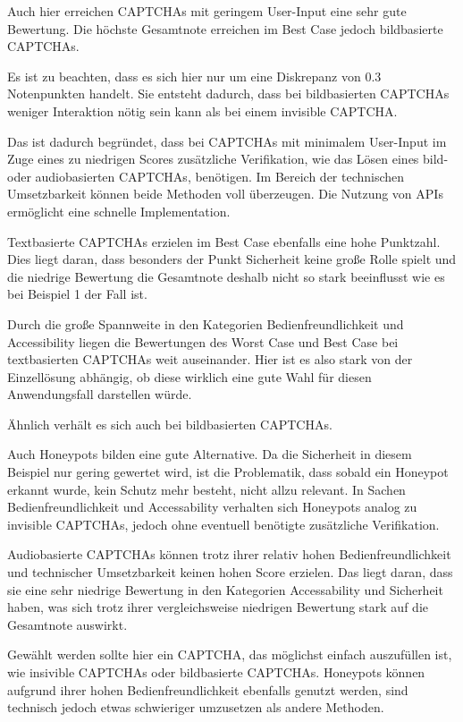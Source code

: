 Auch hier erreichen CAPTCHAs mit geringem User-Input eine sehr gute Bewertung.
Die höchste Gesamtnote erreichen im Best Case jedoch bildbasierte CAPTCHAs.

Es ist zu beachten, dass es sich hier nur um eine Diskrepanz von 0.3 Notenpunkten handelt. 
Sie entsteht dadurch, dass bei bildbasierten CAPTCHAs weniger Interaktion nötig sein kann als bei einem invisible CAPTCHA.

Das ist dadurch begründet, dass bei CAPTCHAs mit minimalem User-Input im Zuge eines zu niedrigen Scores zusätzliche Verifikation, 
wie das Lösen eines bild- oder audiobasierten CAPTCHAs, benötigen.
Im Bereich der technischen Umsetzbarkeit können beide Methoden voll überzeugen. 
Die Nutzung von APIs ermöglicht eine schnelle Implementation.

Textbasierte CAPTCHAs erzielen im Best Case ebenfalls eine hohe Punktzahl. 
Dies liegt daran, dass besonders der Punkt Sicherheit keine große Rolle spielt
und die niedrige Bewertung die Gesamtnote deshalb nicht so stark beeinflusst wie es bei Beispiel 1 der Fall ist. 

Durch die große Spannweite in den Kategorien Bedienfreundlichkeit und Accessibility
liegen die Bewertungen des Worst Case und Best Case bei textbasierten CAPTCHAs weit auseinander.
Hier ist es also stark von der Einzellösung abhängig, ob diese wirklich eine gute Wahl für diesen Anwendungsfall darstellen würde.

Ähnlich verhält es sich auch bei bildbasierten CAPTCHAs. 

Auch Honeypots bilden eine gute Alternative. 
Da die Sicherheit in diesem Beispiel nur gering gewertet wird, ist die Problematik, dass sobald ein Honeypot erkannt wurde,
kein Schutz mehr besteht, nicht allzu relevant. 
In Sachen Bedienfreundlichkeit und Accessability verhalten sich Honeypots analog zu invisible CAPTCHAs,
jedoch ohne eventuell benötigte zusätzliche Verifikation.

Audiobasierte CAPTCHAs können trotz ihrer relativ hohen Bedienfreundlichkeit und technischer Umsetzbarkeit keinen hohen Score erzielen.
Das liegt daran, dass sie eine sehr niedrige Bewertung in den Kategorien Accessability und Sicherheit haben,
was sich trotz ihrer vergleichsweise niedrigen Bewertung stark auf die Gesamtnote auswirkt.

Gewählt werden sollte hier ein CAPTCHA, das möglichst einfach auszufüllen ist, wie insivible CAPTCHAs oder bildbasierte CAPTCHAs. 
Honeypots können aufgrund ihrer hohen Bedienfreundlichkeit ebenfalls genutzt werden, 
sind technisch jedoch etwas schwieriger umzusetzen als andere Methoden.